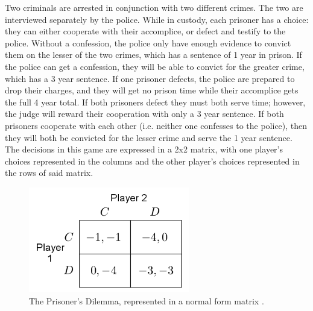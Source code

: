 \begin{exmp}
  Two criminals are arrested in conjunction with two different crimes. The two are interviewed separately by the police. While in custody, each prisoner has a choice: they can either cooperate with their accomplice, or defect and testify to the police. Without a confession, the police only have enough evidence to convict them on the lesser of the two crimes, which has a sentence of 1 year in prison. If the police can get a confession, they will be able to convict for the greater crime, which has a 3 year sentence. If one prisoner defects, the police are prepared to drop their charges, and they will get no prison time while their accomplice gets the full 4 year total. If both prisoners defect they must both serve time; however, the judge will reward their cooperation with only a 3 year sentence. If both prisoners cooperate with each other (i.e. neither one confesses to the police), then they will both be convicted for the lesser crime and serve the 1 year sentence. The decisions in this game are expressed in a 2x2 matrix, with one player's choices represented in the columns and the other player's choices represented in the rows of said matrix.

\begin{figure}[H]
  \centering
  \includegraphics[width=7cm]{figures/ExampleGrid.png}
  \caption{The Prisoner's Dilemma, represented in a normal form matrix \cite{shoh09}.}
  \label{fig:prisoner}
\end{figure}

\end{exmp}

